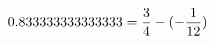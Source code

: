 \documentclass[preview]{standalone}
\begin{document}
\begin{align*}
\special{dvisvgm:raw <g id='unique000'>}0.833333333333333 = \frac{3}{4} - (- \frac{1}{12})\special{dvisvgm:raw </g>}
\end{align*}
\end{document}
